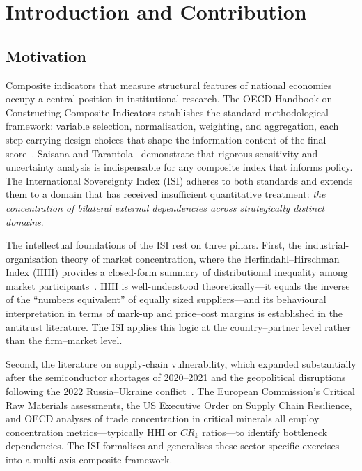 \section{Introduction and Contribution}\label{sec:introduction}

\subsection{Motivation}

Composite indicators that measure structural features of national
economies occupy a central position in institutional research.  The
OECD Handbook on Constructing Composite Indicators establishes the
standard methodological framework: variable selection, normalisation,
weighting, and aggregation, each step carrying design choices that
shape the information content of the final
score~\cite{oecd_handbook_2008}.  Saisana and
Tarantola~\cite{saisana2005} demonstrate that rigorous sensitivity
and uncertainty analysis is indispensable for any composite index
that informs policy.  The International Sovereignty Index (ISI)
adheres to both standards and extends them to a domain that has
received insufficient quantitative treatment: \emph{the concentration
of bilateral external dependencies across strategically distinct
domains}.

The intellectual foundations of the ISI rest on three pillars.
First, the industrial-organisation theory of market concentration,
where the Herfindahl--Hirschman Index (HHI) provides a closed-form
summary of distributional inequality among market
participants~\cite{herfindahl1950,hirschman1964}.  HHI is
well-understood theoretically---it equals the inverse of the
``numbers equivalent'' of equally sized suppliers---and its
behavioural interpretation in terms of mark-up and price--cost
margins is established in the antitrust literature.  The ISI applies
this logic at the country--partner level rather than the
firm--market level.

Second, the literature on supply-chain vulnerability, which expanded
substantially after the semiconductor shortages of 2020--2021 and
the geopolitical disruptions following the 2022 Russia--Ukraine
conflict~\cite{ec_critical_raw}.  The European Commission's Critical
Raw Materials assessments, the US Executive Order on Supply Chain
Resilience, and OECD analyses of trade concentration in critical
minerals all employ concentration metrics---typically HHI or
$CR_k$ ratios---to identify bottleneck dependencies.  The ISI
formalises and generalises these sector-specific exercises into a
multi-axis composite framework.

